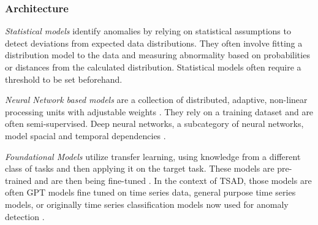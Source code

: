 \documentclass[12pt,oneside]{article}
\begin{document}
\subsubsection{Architecture} \textit{Statistical models} identify anomalies by relying on statistical assumptions to detect deviations from expected data distributions. They often involve fitting a distribution model to the data and measuring abnormality based on probabilities or distances from the calculated distribution. Statistical models often require a threshold to be set beforehand\parencites[p.~6-7]{liu2024elephant}[p.~1]{FOULADI2020102587}. \par \textit{Neural Network based models} are a collection of distributed, adaptive, non-linear processing units with adjustable weights \parencites[p.~427]{GURESEN2011426}. They rely on a training dataset and are often semi-supervised. Deep neural networks, a subcategory of neural networks, model spacial and temporal dependencies \parencites[p.~6-7]{liu2024elephant}[p.~6]{Zamanzadeh_Darban_2024}.\par \textit{Foundational Models} utilize transfer learning, using knowledge from a different class of tasks and then applying it on the target task. These models are pre-trained and are then being fine-tuned \parencites[p.~4]{bommasani2022opportunitiesrisksfoundationmodels}. In the context of TSAD, those models are often GPT models fine tuned on time series data, general purpose time series models, or originally time series classification models now used for anomaly detection \parencites[p.~7]{liu2024elephant}.
\end{document}
